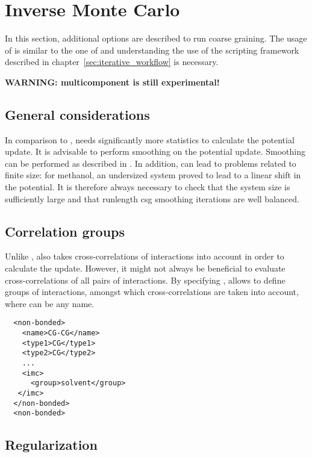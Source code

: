 \section{Inverse Monte Carlo}
\label{sec:iterative_methods_imc}
In this section, additional options are described to run \imc coarse graining. The usage of \imc is similar to the one of \ibi and understanding the use of the scripting framework described in chapter~\ref{sec:iterative_workflow} is necessary.

\textbf{WARNING: multicomponent \imc is still experimental!}

\subsection{General considerations}
In comparison to \ibi, \imc needs significantly more statistics to calculate the potential update\cite{Ruehle:2009.a}. It is advisable to perform smoothing on the potential update. Smoothing can be performed as described in . In addition, \imc can lead to problems related to finite size: for methanol, an undersized system proved to lead to a linear shift in the potential\cite{Ruehle:2009.a}. It is therefore always necessary to check that the system size is sufficiently large and that runlength csg smoothing iterations are well balanced.

\subsection{Correlation groups}
Unlike \ibi, \imc also takes cross-correlations of interactions into account in order to calculate the update. However, it might not always be beneficial to evaluate cross-correlations of all pairs of interactions. By specifying , \votca allows to define groups of interactions, amongst which cross-correlations are taken into account, where  can be any name.

\begin{lstlisting}
  <non-bonded>
    <name>CG-CG</name>
    <type1>CG</type1>
    <type2>CG</type2>
    ...
    <imc>
      <group>solvent</group>
   </imc>
  </non-bonded>
  <non-bonded>
\end{lstlisting}

\subsection{Regularization}

